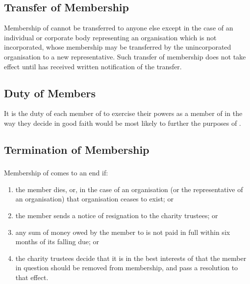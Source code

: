     \subsection{Transfer of Membership}\label{sec:transfer}
    Membership of \shortname{} cannot be transferred to anyone else except in the case of an individual or corporate body representing an organisation which is not incorporated, whose membership may be transferred by the unincorporated organisation to a new representative. Such transfer of membership does not take effect until \shortname{} has received written notification of the transfer.

    \subsection{Duty of Members}\label{sec:duty}
    It is the duty of each member of \shortname{} to exercise their powers as a member of \shortname{} in the way they decide in good faith would be most likely to further the purposes of \shortname{}.

    \subsection{Termination of Membership}\label{sec:terminiation}

        \subsubsection{}
        Membership of \shortname{} comes to an end if:
        \begin{enumerate}
            \item the member dies, or, in the case of an organisation (or the representative of an organisation) that organisation ceases to exist; or
            \item the member sends a notice of resignation to the charity trustees; or
            \item any sum of money owed by the member to \shortname{} is not paid in full within six months of its falling due; or
            \item the charity trustees decide that it is in the best interests of \shortname{} that the member in question should be removed from membership, and pass a resolution to that effect.
        \end{enumerate}

